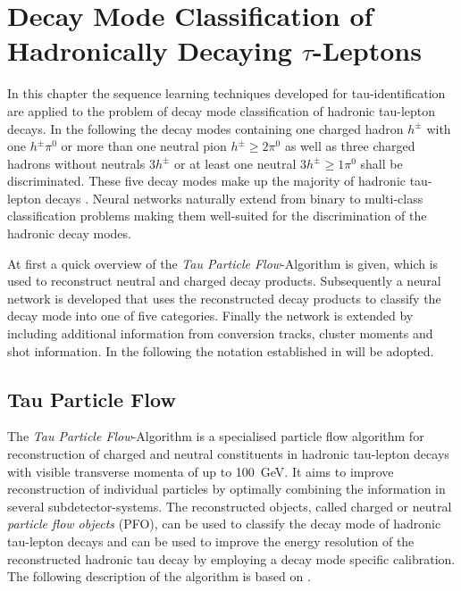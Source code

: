 \chapter{Decay Mode Classification of Hadronically Decaying $\tau$-Leptons}
\label{sec:decaymode}

In this chapter the sequence learning techniques developed for
tau-identification are applied to the problem of decay mode classification of
hadronic tau-lepton decays. In the following the decay modes containing one
charged hadron $h^\pm$ with one $h^\pm \pi^0$ or more than one neutral pion
$h^\pm \geq 2\pi^0$ as well as three charged hadrons without neutrals $3h^\pm$
or at least one neutral $3h^\pm \geq 1\pi^0$ shall be discriminated. These five
decay modes make up the majority of hadronic tau-lepton decays . Neural networks naturally extend from binary to multi-class
classification problems making them well-suited for the discrimination of the
hadronic decay modes.

At first a quick overview of the \emph{Tau Particle Flow}-Algorithm is given,
which is used to reconstruct neutral and charged decay products. Subsequently a
neural network is developed that uses the reconstructed decay products to
classify the decay mode into one of five categories. Finally the network is
extended by including additional information from conversion tracks, cluster
moments and shot information. In the following the notation established in
\cite{atlas:taurec:decaymodes} will be adopted.


\section{Tau Particle Flow}
\label{sec:tau_pflow}

The \emph{Tau Particle Flow}-Algorithm is a specialised particle flow algorithm
for reconstruction of charged and neutral constituents in hadronic tau-lepton
decays with visible transverse momenta of up to \SI{100}{\giga\electronvolt}. It
aims to improve reconstruction of individual particles by optimally combining
the information in several subdetector-systems. The reconstructed objects,
called charged or neutral \emph{particle flow objects} (PFO), can be used to
classify the decay mode of hadronic tau-lepton decays and can be used to improve
the energy resolution of the reconstructed hadronic tau decay by employing a
decay mode specific calibration. The following description of the algorithm is
based on \cite{atlas:taurec:decaymodes}.

